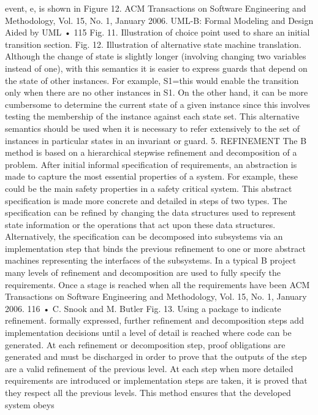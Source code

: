 event, e, is shown in Figure 12.
ACM Transactions on Software Engineering and Methodology, Vol. 15, No. 1, January 2006.
UML-B: Formal Modeling and Design Aided by UML • 115
Fig. 11. Illustration of choice point used to share an initial transition section.
Fig. 12. Illustration of alternative state machine translation.
Although the change of state is slightly longer (involving changing two variables instead of one), with this semantics it is easier to express guards that
depend on the state of other instances. For example, S1={this} would enable
the transition only when there are no other instances in S1. On the other hand,
it can be more cumbersome to determine the current state of a given instance
since this involves testing the membership of the instance against each state
set. This alternative semantics should be used when it is necessary to refer
extensively to the set of instances in particular states in an invariant or guard.
5. REFINEMENT
The B method is based on a hierarchical stepwise refinement and decomposition of a problem. After initial informal specification of requirements, an abstraction is made to capture the most essential properties of a system. For
example, these could be the main safety properties in a safety critical system.
This abstract specification is made more concrete and detailed in steps of two
types. The specification can be refined by changing the data structures used to
represent state information or the operations that act upon these data structures. Alternatively, the specification can be decomposed into subsystems via
an implementation step that binds the previous refinement to one or more abstract machines representing the interfaces of the subsystems. In a typical B
project many levels of refinement and decomposition are used to fully specify
the requirements. Once a stage is reached when all the requirements have been
ACM Transactions on Software Engineering and Methodology, Vol. 15, No. 1, January 2006.
116 • C. Snook and M. Butler
Fig. 13. Using a package to indicate refinement.
formally expressed, further refinement and decomposition steps add implementation decisions until a level of detail is reached where code can be generated.
At each refinement or decomposition step, proof obligations are generated and
must be discharged in order to prove that the outputs of the step are a valid
refinement of the previous level. At each step when more detailed requirements
are introduced or implementation steps are taken, it is proved that they respect
all the previous levels. This method ensures that the developed system obeys
